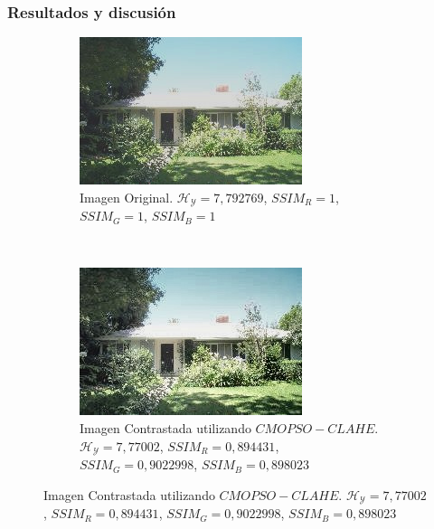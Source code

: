 \documentclass[usenames,dvipsnames]{beamer}
\begin{document}
\begin{frame}
\frametitle{Resultados y discusión} 

\begin{figure}[H]
\centering
\begin{subfigure}[t]{0.45\textwidth}
\includegraphics[width=\textwidth]{graphics/calhouse_0230.jpg}
\caption{Imagen Original. $\mathscr{H_Y}=7,792769$, $SSIM_R=1$, $SSIM_G=1$, $SSIM_B=1$}
\label{fig:casa1original}
\end{subfigure}
    ~ %
      \begin{subfigure}[t]{0.45\textwidth}
      \includegraphics[width=\textwidth]{graphics/69-resultado.jpg}
      \caption{Imagen Contrastada utilizando $CMOPSO-CLAHE$. $\mathscr{H_Y}=7,77002$, $SSIM_R=0,894431$, $SSIM_G=0,9022998$, $SSIM_B=0,898023$}

\end{subfigure}
\end{figure}
\end{frame}
\end{document}
